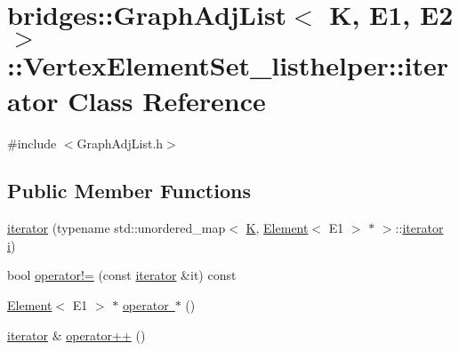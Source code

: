 \hypertarget{classbridges_1_1_graph_adj_list_1_1_vertex_element_set__listhelper_1_1iterator}{}\section{bridges\+::Graph\+Adj\+List$<$ K, E1, E2 $>$\+::Vertex\+Element\+Set\+\_\+listhelper\+::iterator Class Reference}
\label{classbridges_1_1_graph_adj_list_1_1_vertex_element_set__listhelper_1_1iterator}


{\ttfamily \#include $<$Graph\+Adj\+List.\+h$>$}

\subsection*{Public Member Functions}
\begin{DoxyCompactItemize}
\item 
\mbox{\hyperlink{classbridges_1_1_graph_adj_list_1_1_vertex_element_set__listhelper_1_1iterator_a73bc4be2fe2dc6edb80bc9bae4ac3581}{iterator}} (typename std\+::unordered\+\_\+map$<$ \mbox{\hyperlink{namespacebridges_acfb0a4f7877d8f63de3e6862004c50edaa5f3c6a11b03839d46af9fb43c97c188}{K}}, \mbox{\hyperlink{classbridges_1_1_element}{Element}}$<$ E1 $>$ $\ast$ $>$\+::\mbox{\hyperlink{classbridges_1_1_graph_adj_list_1_1_vertex_element_set__listhelper_1_1iterator}{iterator}} \mbox{\hyperlink{namespacebridges_acfb0a4f7877d8f63de3e6862004c50eda865c0c0b4ab0e063e5caa3387c1a8741}{i}})
\item 
bool \mbox{\hyperlink{classbridges_1_1_graph_adj_list_1_1_vertex_element_set__listhelper_1_1iterator_a559f32f0f60269d7d8b793e197e9b0ba}{operator!=}} (const \mbox{\hyperlink{classbridges_1_1_graph_adj_list_1_1_vertex_element_set__listhelper_1_1iterator}{iterator}} \&it) const
\item 
\mbox{\hyperlink{classbridges_1_1_element}{Element}}$<$ E1 $>$ $\ast$ \mbox{\hyperlink{classbridges_1_1_graph_adj_list_1_1_vertex_element_set__listhelper_1_1iterator_ae0ff1ececb5e8900119fdc99094b2ac7}{operator $\ast$}} ()
\item 
\mbox{\hyperlink{classbridges_1_1_graph_adj_list_1_1_vertex_element_set__listhelper_1_1iterator}{iterator}} \& \mbox{\hyperlink{classbridges_1_1_graph_adj_list_1_1_vertex_element_set__listhelper_1_1iterator_ad0d28c10ae2a8a5592ccda4b659fd638}{operator++}} ()
\end{DoxyCompactItemize}


